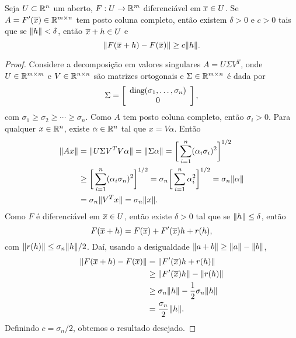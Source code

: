 \begin{theorem}
Seja $U \subset \mathbb{R}^{n}$ um aberto, $F:U\rightarrow\mathbb{R}^{m}$
diferenciável em $\overline{x} \in U$.
Se $A = F'(\overline{x}) \in \mathbb{R}^{{m}\times{n}}$ tem posto coluna completo,
então existem $\delta > 0$ 
e $c > 0$ tais que se $\Vert h\Vert < \delta$,
então $\overline{x} + h \in U$ e
$$ \Vert F(\overline{x} + h) - F(\overline{x})\Vert \geq c\Vert h\Vert. $$
\end{theorem}
\begin{proof}
Considere a decomposição em valores singulares
$A = U\Sigma V^T$, onde $U \in \mathbb{R}^{{m}\times{m}}$ e
$V \in \mathbb{R}^{{n}\times{n}}$ são matrizes ortogonais e
$\Sigma \in \mathbb{R}^{{m}\times{n}}$ é dada por
$$\Sigma = \left[\begin{array}{c}\mbox{diag}(\sigma_1,\dots,\sigma_n) \\ 0\end{array}\right], $$
com $\sigma_1 \geq \sigma_2 \geq \cdots \geq \sigma_n$.
Como $A$ tem posto coluna completo, então $\sigma_i > 0$.
Para qualquer $x \in \mathbb{R}^{n}$, existe $\alpha \in \mathbb{R}^{n}$ 
tal que $x = V\alpha$. Então
\begin{align*}
  \Vert Ax\Vert & = \Vert U\Sigma V^TV\alpha\Vert
  = \Vert \Sigma\alpha\Vert = 
  \bigg[\sum_{i=1}^n(\alpha_i\sigma_i)^2\bigg]^{1/2} \\
  & \geq \bigg[\sum_{i=1}^n(\alpha_i\sigma_n)^2\bigg]^{1/2}
  = \sigma_n \bigg[\sum_{i=1}^n\alpha_i^2\bigg]^{1/2}
  = \sigma_n\Vert \alpha\Vert \\
  & = \sigma_n\Vert V^Tx\Vert = \sigma_n\Vert x\Vert.
\end{align*}
Como $F$ é diferenciável em $\overline{x} \in U$, então
existe $\delta > 0$ tal que se $\Vert h\Vert \leq \delta$,
então
$$F(\overline{x} + h) = F(\overline{x}) + F'(\overline{x})h + r(h),$$
com $\Vert r(h)\Vert \leq \sigma_n\Vert h\Vert/2$.
Daí, usando a desigualdade $\Vert a + b\Vert \geq \Vert a\Vert - \Vert b\Vert$,
\begin{align*}
\Vert F(\overline{x} + h) - F(\overline{x})\Vert & =
\Vert F'(\overline{x})h + r(h)\Vert \\
& \geq \Vert F'(\overline{x})h\Vert - \Vert r(h)\Vert \\
& \geq \sigma_n\Vert h\Vert - \frac{1}{2}\sigma_n\Vert h\Vert \\
& = \frac{\sigma_n}{2}\Vert h\Vert.
\end{align*}
Definindo $c = \sigma_n/2$, obtemos o resultado desejado.
\end{proof}

